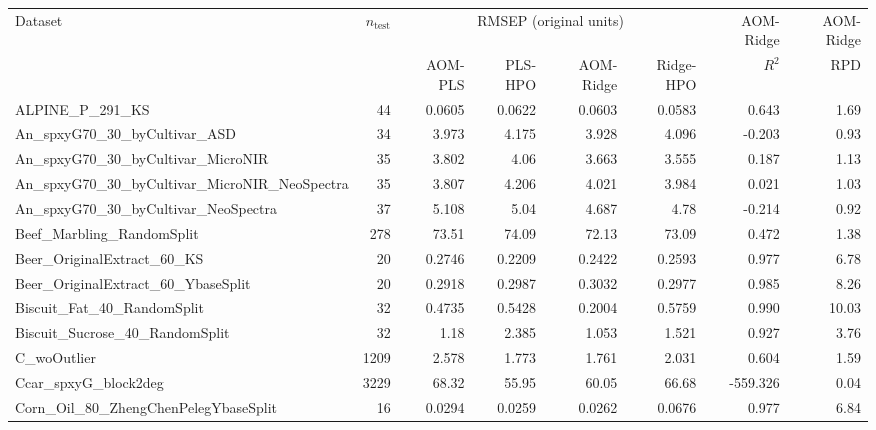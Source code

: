 \begin{tabularx}{\linewidth}{Xrrrrrrr}
\toprule
Dataset & $n_{\mathrm{test}}$ & \multicolumn{4}{c}{RMSEP (original units)} & AOM-\allowbreak{}Ridge & AOM-\allowbreak{}Ridge \\
\cmidrule(lr){3-6}
 & & AOM-\allowbreak{}PLS & PLS-\allowbreak{}HPO & AOM-\allowbreak{}Ridge & Ridge-\allowbreak{}HPO & $R^2$ & RPD \\
\midrule
ALPINE\_\allowbreak{}P\_\allowbreak{}291\_\allowbreak{}KS & 44 & 0.0605 & 0.0622 & 0.0603 & 0.0583 & 0.643 & 1.69 \\
An\_\allowbreak{}spxyG70\_\allowbreak{}30\_\allowbreak{}byCultivar\_\allowbreak{}ASD & 34 & 3.973 & 4.175 & 3.928 & 4.096 & -0.203 & 0.93 \\
An\_\allowbreak{}spxyG70\_\allowbreak{}30\_\allowbreak{}byCultivar\_\allowbreak{}MicroNIR & 35 & 3.802 & 4.06 & 3.663 & 3.555 & 0.187 & 1.13 \\
An\_\allowbreak{}spxyG70\_\allowbreak{}30\_\allowbreak{}byCultivar\_\allowbreak{}MicroNIR\_\allowbreak{}NeoSpectra & 35 & 3.807 & 4.206 & 4.021 & 3.984 & 0.021 & 1.03 \\
An\_\allowbreak{}spxyG70\_\allowbreak{}30\_\allowbreak{}byCultivar\_\allowbreak{}NeoSpectra & 37 & 5.108 & 5.04 & 4.687 & 4.78 & -0.214 & 0.92 \\
Beef\_\allowbreak{}Marbling\_\allowbreak{}RandomSplit & 278 & 73.51 & 74.09 & 72.13 & 73.09 & 0.472 & 1.38 \\
Beer\_\allowbreak{}OriginalExtract\_\allowbreak{}60\_\allowbreak{}KS & 20 & 0.2746 & 0.2209 & 0.2422 & 0.2593 & 0.977 & 6.78 \\
Beer\_\allowbreak{}OriginalExtract\_\allowbreak{}60\_\allowbreak{}YbaseSplit & 20 & 0.2918 & 0.2987 & 0.3032 & 0.2977 & 0.985 & 8.26 \\
Biscuit\_\allowbreak{}Fat\_\allowbreak{}40\_\allowbreak{}RandomSplit & 32 & 0.4735 & 0.5428 & 0.2004 & 0.5759 & 0.990 & 10.03 \\
Biscuit\_\allowbreak{}Sucrose\_\allowbreak{}40\_\allowbreak{}RandomSplit & 32 & 1.18 & 2.385 & 1.053 & 1.521 & 0.927 & 3.76 \\
C\_\allowbreak{}woOutlier & 1209 & 2.578 & 1.773 & 1.761 & 2.031 & 0.604 & 1.59 \\
Ccar\_\allowbreak{}spxyG\_\allowbreak{}block2deg & 3229 & 68.32 & 55.95 & 60.05 & 66.68 & -559.326 & 0.04 \\
Corn\_\allowbreak{}Oil\_\allowbreak{}80\_\allowbreak{}ZhengChenPelegYbaseSplit & 16 & 0.0294 & 0.0259 & 0.0262 & 0.0676 & 0.977 & 6.84 \\

\end{tabularx}

